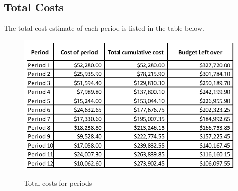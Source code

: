 \subsection{Total Costs}

The total cost estimate of each period is listed in the table below. %

\begin{figure}[H]
\centering
\includegraphics[scale=0.6]{images/totalcost.png}
\label{fig:totalcosts}
\caption{Total costs for periods}
\end{figure}

